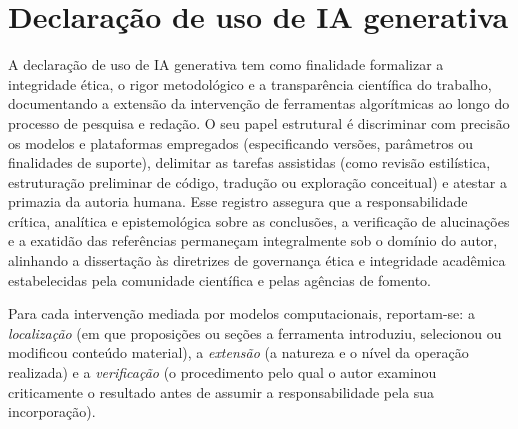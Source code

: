 \chapter*{Declaração de uso de IA generativa}
{}
\label{ch:declaracao_ia_generativa}
A declaração de uso de IA generativa tem como finalidade formalizar a integridade ética, o rigor metodológico e a transparência científica do trabalho, documentando a extensão da intervenção de ferramentas algorítmicas ao longo do processo de pesquisa e redação. O seu papel estrutural é discriminar com precisão os modelos e plataformas empregados (especificando versões, parâmetros ou finalidades de suporte), delimitar as tarefas assistidas (como revisão estilística, estruturação preliminar de código, tradução ou exploração conceitual) e atestar a primazia da autoria humana. Esse registro assegura que a responsabilidade crítica, analítica e epistemológica sobre as conclusões, a verificação de alucinações e a exatidão das referências permaneçam integralmente sob o domínio do autor, alinhando a dissertação às diretrizes de governança ética e integridade acadêmica estabelecidas pela comunidade científica e pelas agências de fomento.

Para cada intervenção mediada por modelos computacionais, reportam-se: a \textit{localização} (em que proposições ou seções a ferramenta introduziu, selecionou ou modificou conteúdo material), a \textit{extensão} (a natureza e o nível da operação realizada) e a \textit{verificação} (o procedimento pelo qual o autor examinou criticamente o resultado antes de assumir a responsabilidade pela sua incorporação).

